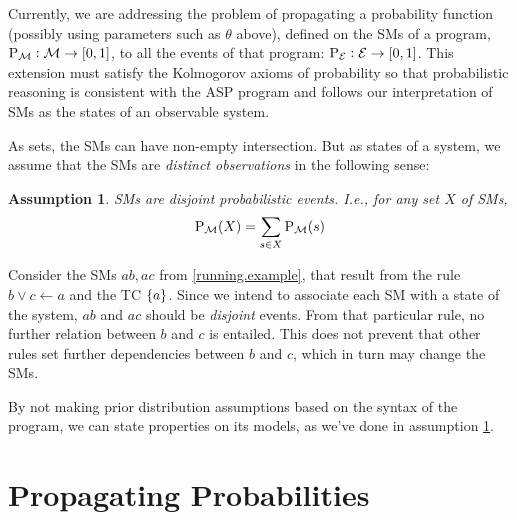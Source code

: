 \documentclass[a4paper]{article}
\newtheorem{assumption}{Assumption}
\newcommand{\at}[1]{\ensuremath{\!\del{#1}}}        %
\newcommand{\cla}[1]{\ensuremath{{\cal #1}}}        %
\newcommand{\clause}{\ensuremath{\leftarrow}}
\newcommand{\MODELset}{\ensuremath{\cla{M}}}
\newcommand{\EVENTSset}{\ensuremath{\cla{E}}}
\newcommand{\prfunc}{\ensuremath{\mathrm{P}}}
\newcommand{\prd}[1]{\ensuremath{\prfunc_{#1}}}
\newcommand{\prM}{\prd{\MODELset}}
\newcommand{\prE}{\prd{\EVENTSset}}
\newcommand{\franc}[1]{{\color{green!30!black}#1}}
\begin{document}
Currently, we are addressing the problem of propagating a probability
function (possibly using parameters such as \(\theta\) above), defined
on the \aclp{SM} of a program,
\franc{\(\prM: \MODELset \to \intcc{0,1}\)}, to all the events of that
program: \franc{\(\prE: \EVENTSset \to \intcc{0,1}\)}.  This extension
must satisfy the Kolmogorov axioms of probability so that
probabilistic reasoning is consistent with the \ac{ASP} program and
follows our interpretation of \aclp{SM} as the states of an observable
system.

As sets, the \aclp{SM} can have non-empty intersection.  But as states
of a system, we assume that the \aclp{SM} are \emph{distinct
  observations} in the following sense:

\begin{assumption}\label{assumption:smodels.disjoint}%
  \Aclp{SM} are disjoint probabilistic events. \textit{I.e.,} for any
  set \(X\) of \aclp{SM},
  \begin{equation}
        \prM\at{X} = \sum_{s\in X}\prM\at{s}
  \end{equation}
\end{assumption}

Consider the \aclp{SM} \(ab, ac\) from \cref{running.example}, that
result from the rule \(b \vee c \clause a\) and the \acl{TC}
\(\set{a}\).  Since we intend to associate each \acl{SM} with a state
of the system, \(ab\) and \(ac\) should be \emph{disjoint} events.
From that particular rule, no further relation between \(b\) and \(c\)
is entailed.  This does not prevent that other rules set further
dependencies between \(b\) and \(c\), which in turn may change the
\aclp{SM}.

By not making prior distribution assumptions based on the syntax of
the program, we can state properties on its models, as we've done in
assumption \ref{assumption:smodels.disjoint}.


\section{Propagating Probabilities}
\label{sec:propagating.probalilities}
\end{document}
